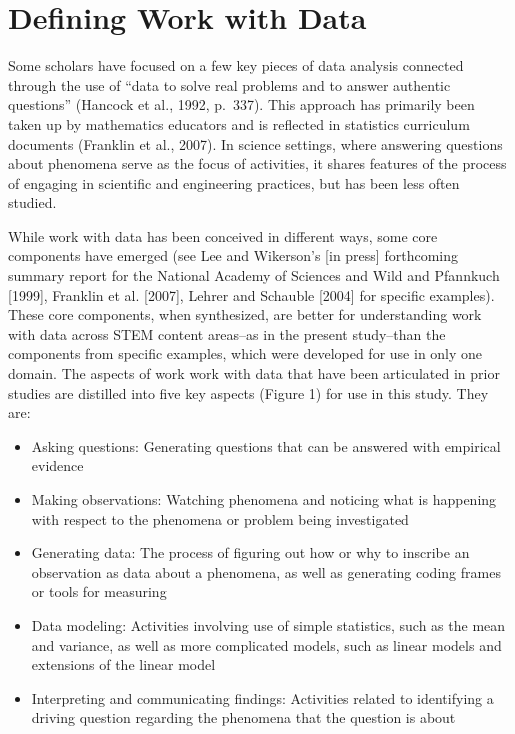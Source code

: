 \documentclass[]{msu-thesis}
\providecommand{\tightlist}{%
  \setlength{\itemsep}{0pt}\setlength{\parskip}{0pt}}
\theoremstyle{definition}
\theoremstyle{definition}
\theoremstyle{definition}
\theoremstyle{remark}
\begin{document}
\section{Defining Work with Data}\label{defining-work-with-data}

Some scholars have focused on a few key pieces of data analysis
connected through the use of ``data to solve real problems and to answer
authentic questions'' (Hancock et al., 1992, p.~337). This approach has
primarily been taken up by mathematics educators and is reflected in
statistics curriculum documents (Franklin et al., 2007). In science
settings, where answering questions about phenomena serve as the focus
of activities, it shares features of the process of engaging in
scientific and engineering practices, but has been less often studied.

While work with data has been conceived in different ways, some core
components have emerged (see Lee and Wikerson's {[}in press{]}
forthcoming summary report for the National Academy of Sciences and Wild
and Pfannkuch {[}1999{]}, Franklin et al. {[}2007{]}, Lehrer and
Schauble {[}2004{]} for specific examples). These core components, when
synthesized, are better for understanding work with data across STEM
content areas--as in the present study--than the components from
specific examples, which were developed for use in only one domain. The
aspects of work work with data that have been articulated in prior
studies are distilled into five key aspects (Figure 1) for use in this
study. They are:

\begin{itemize}
\tightlist
\item
  Asking questions: Generating questions that can be answered with
  empirical evidence
\item
  Making observations: Watching phenomena and noticing what is happening
  with respect to the phenomena or problem being investigated
\item
  Generating data: The process of figuring out how or why to inscribe an
  observation as data about a phenomena, as well as generating coding
  frames or tools for measuring
\item
  Data modeling: Activities involving use of simple statistics, such as
  the mean and variance, as well as more complicated models, such as
  linear models and extensions of the linear model
\item
  Interpreting and communicating findings: Activities related to
  identifying a driving question regarding the phenomena that the
  question is about
\end{itemize}
\end{document}
